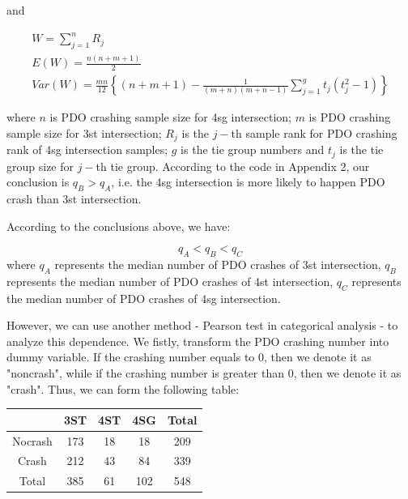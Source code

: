 \documentclass[11pt]{scrartcl} %
\begin{document}
and

\begin{equation*}
\begin{array}{l}
W = \sum\limits_{j = 1}^n {{R_j}} \\
E\left( W \right) = \frac{{n\left( {n + m + 1} \right)}}{2}\\
Var\left( W \right) = \frac{{mn}}{{12}}\left\{ {\left( {n + m + 1} \right) - \frac{1}{{\left( {m + n} \right)\left( {m + n - 1} \right)}}\sum\limits_{j = 1}^g {{t_j}\left( {t_j^2 - 1} \right)} } \right\}
\end{array}
\end{equation*}

where $n$ is PDO crashing sample size for 4sg intersection; $m$ is PDO crashing sample size for 3st intersection; $R_j$ is the $j-$th sample rank for PDO crashing rank of 4sg intersection samples; $g$ is the tie group numbers and $t_j$ is the tie group size for $j-$th tie group. According to the code in Appendix 2, our conclusion is ${{q_B} > {q_A}}$, i.e. the 4sg intersection is more likely to happen PDO crash than 3st intersection.

\par

According to the conclusions above, we have:

\begin{equation*}
{q_A} < {q_B} < {q_C}
\end{equation*}
where $q_A$ represents the median number of PDO crashes of 3st intersection, $q_B$ represents the median number of PDO crashes of 4st intersection, $q_C$ represents the median number of PDO crashes of 4sg intersection.

\par
However, we can use another method - Pearson test in categorical analysis - to analyze this dependence. We fistly, transform the PDO crashing number into dummy variable. If the crashing number equals to 0, then we denote it as "noncrash", while if the crashing number is greater than 0, then we denote it as "crash". Thus, we can form the following table:

\begin{table}[H]
\begin{tabular}{|c|c|c|c|c|}
\hline
      & 3ST & 4ST & 4SG & Total \\
\hline
Nocrash & 173 & 18  & 18 & 209 \\
\hline
Crash    & 212  & 43  & 84  & 339 \\
\hline
Total    & 385  & 61  & 102  & 548 \\
\hline
\end{tabular}
\end{table}
\end{document}
